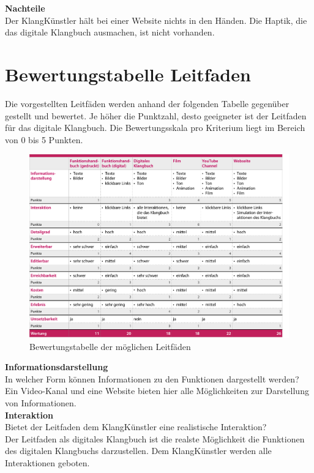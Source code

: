 \textbf{Nachteile}\\
Der KlangKünstler hält bei einer Website nichts in den Händen. Die Haptik, die das digitale Klangbuch ausmachen, ist nicht vorhanden.


\section{Bewertungstabelle Leitfaden}

Die vorgestellten Leitfäden werden anhand der folgenden Tabelle gegenüber gestellt und bewertet. Je höher die Punktzahl, desto geeigneter ist der Leitfaden für das digitale Klangbuch. Die Bewertungsskala pro Kriterium liegt im Bereich von 0 bis 5 Punkten.


\begin{figure}[!ht]
		\includegraphics[natwidth=920pt, natheight=95pt, width=1.0\textwidth]{grafiken/leitfaden-bewertung.pdf}
\caption{Bewertungstabelle der möglichen Leitfäden}
\end{figure}


\textbf{Informationsdarstellung}\\
In welcher Form können Informationen zu den Funktionen dargestellt werden?\\
Ein Video-Kanal und eine Website bieten hier alle Möglichkeiten zur Darstellung von Informationen.\\

\textbf{Interaktion}\\
Bietet der Leitfaden dem KlangKünstler eine realistische Interaktion?\\
Der Leitfaden als digitales Klangbuch ist die realste Möglichkeit die Funktionen des digitalen Klangbuchs darzustellen. Dem KlangKünstler werden alle Interaktionen geboten.\\

